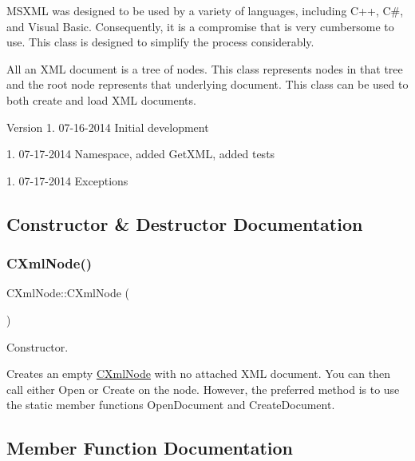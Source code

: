 M\+S\+X\+ML was designed to be used by a variety of languages, including C++, C\#, and Visual Basic. Consequently, it is a compromise that is very cumbersome to use. This class is designed to simplify the process considerably.

All an X\+ML document is a tree of nodes. This class represents nodes in that tree and the root node represents that underlying document. This class can be used to both create and load X\+ML documents.

\begin{DoxyVersion}{Version}
1. 07-\/16-\/2014 Initial development 

1. 07-\/17-\/2014 Namespace, added Get\+X\+ML, added tests 

1. 07-\/17-\/2014 Exceptions 
\end{DoxyVersion}


\subsection{Constructor \& Destructor Documentation}
\mbox{\label{classxmlnode_1_1_c_xml_node_a0f05b63e034bb5620609a2020c591d55}} 
\subsubsection{\texorpdfstring{C\+Xml\+Node()}{CXmlNode()}}
{\footnotesize\ttfamily C\+Xml\+Node\+::\+C\+Xml\+Node (\begin{DoxyParamCaption}{ }\end{DoxyParamCaption})}



Constructor. 

Creates an empty \mbox{\hyperlink{classxmlnode_1_1_c_xml_node}{C\+Xml\+Node}} with no attached X\+ML document. You can then call either Open or Create on the node. However, the preferred method is to use the static member functions Open\+Document and Create\+Document. 

\subsection{Member Function Documentation}
\mbox{\label{classxmlnode_1_1_c_xml_node_a7227a654358ffb87a2a57c165dee509c}} 
